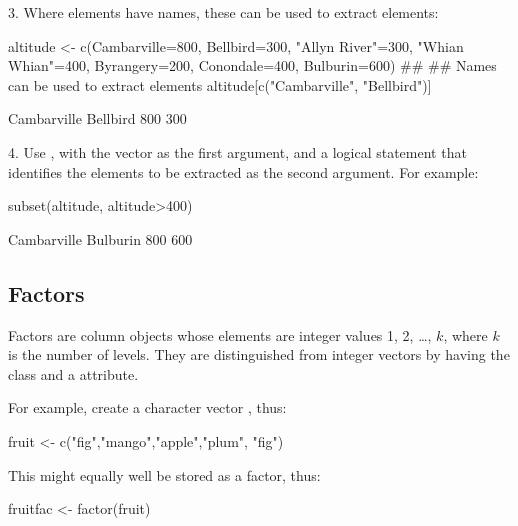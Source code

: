 3. Where elements have names, these can be used to extract elements:
\begin{Schunk}
\begin{Sinput}
altitude <- c(Cambarville=800, Bellbird=300,
              "Allyn River"=300,
              "Whian Whian"=400,
              Byrangery=200, Conondale=400,
              Bulburin=600)
##
## Names can be used to extract elements
altitude[c("Cambarville", "Bellbird")]
\end{Sinput}
\begin{Soutput}
Cambarville    Bellbird 
        800         300 
\end{Soutput}
\end{Schunk}

4. Use , with the vector as the first argument,
and a logical statement that identifies the elements to be
extracted as the second argument. For example:
\begin{Schunk}
\begin{Sinput}
subset(altitude, altitude>400)
\end{Sinput}
\begin{Soutput}
Cambarville    Bulburin 
        800         600 
\end{Soutput}
\end{Schunk}

\subsection{Factors}\label{ss:factors}

Factors are column objects whose elements are integer values 1, 2,
\ldots, $k$, where $k$ is the number of levels.  They are
distinguished from integer vectors by having the class 
and a  attribute.

For example, create a character vector , thus:
\begin{Schunk}
\begin{Sinput}
fruit <- c("fig","mango","apple","plum", "fig")
\end{Sinput}
\end{Schunk}
This might equally well be stored as a factor, thus:
\begin{Schunk}
\begin{Sinput}
fruitfac <- factor(fruit)
\end{Sinput}
\end{Schunk}


